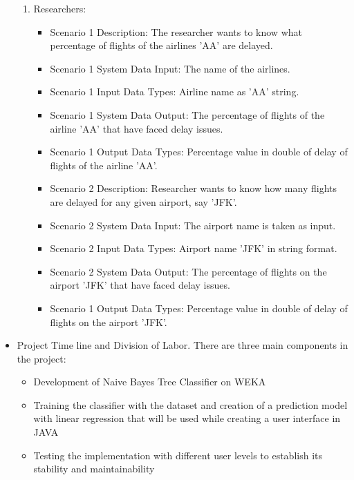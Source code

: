 \begin{itemize}
\begin{enumerate}
    

    \item{Researchers:}
\begin{itemize} 

	\item{Scenario 1 Description: }
    The researcher wants to know what percentage of flights of the airlines 'AA' are delayed.
	\item{Scenario 1 System Data Input: }
 The name of the airlines.    
    \item{Scenario 1 Input Data Types: }
    Airline name as 'AA' string.
    \item{Scenario 1 System Data Output: }
    The percentage of flights of the airline 'AA' that have faced delay issues.
    \item{Scenario 1 Output Data Types: }
    Percentage value in double of delay of flights of the airline 'AA'.
    
    \item{Scenario 2 Description: }
    Researcher wants to know how many flights are delayed for any given airport, say 'JFK'.
    \item{Scenario 2 System Data Input: }
    The airport name is taken as input.
    \item{Scenario 2 Input Data Types: }
	Airport name 'JFK' in string format.
    \item{Scenario 2 System Data Output: }
    The percentage of flights on the airport 'JFK' that have faced delay issues.
    \item{Scenario 1 Output Data Types: }
    Percentage value in double of delay of flights on the airport 'JFK'.
    
    \end{itemize}
\end{enumerate}    

\item{Project Time line and Division of Labor.}
There are three main components in the project:
\begin{itemize} 

\item{Development of Naive Bayes Tree Classifier on WEKA}
\item{Training the classifier with the dataset and creation of a prediction model with linear regression that will be used while creating a user interface in JAVA}
\item{Testing the implementation with different user levels to establish its stability and maintainability}
\end{itemize}


\end{itemize}
